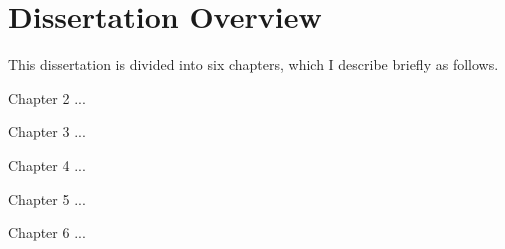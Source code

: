 \section{Dissertation Overview}
This dissertation is divided into six chapters, which I describe briefly as follows.

Chapter 2 ...

Chapter 3 ...

Chapter 4 ...

Chapter 5 ...

Chapter 6 ...